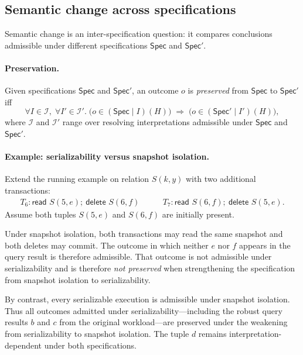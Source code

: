 \documentclass[acmsmall,nonacm]{acmart}
\theoremstyle{remark}
\numberwithin{definition}{section}
\numberwithin{theorem}{section}
\numberwithin{lemma}{section}
\numberwithin{corollary}{section}
\numberwithin{remark}{section}
\numberwithin{example}{section}
\numberwithin{observation}{section}
\numberwithin{assumption}{section}
\newcommand{\Spec}{\mathsf{Spec}}
\begin{document}
\subsection{Semantic change across specifications}
\label{sec:semantic-change}

Semantic change is an inter-specification question: it compares conclusions
admissible under different specifications $\Spec$ and $\Spec'$.

\paragraph{Preservation.}
Given specifications $\Spec$ and $\Spec'$, an outcome $o$ is \emph{preserved}
from $\Spec$ to $\Spec'$ iff
\[
  \forall I \in \mathcal{I},\; \forall I' \in \mathcal{I}'.\;
  \bigl(o \in (\Spec \mid I)(H)\bigr)
  \;\Rightarrow\;
  \bigl(o \in (\Spec' \mid I')(H)\bigr),
\]
where $\mathcal{I}$ and $\mathcal{I}'$ range over resolving interpretations
admissible under $\Spec$ and $\Spec'$.

\paragraph{Example: serializability versus snapshot isolation.}
Extend the running example on relation $S(k,y)$ with two additional transactions:
\[
\begin{array}{ll}
T_6: \textsf{read } S(5,e);\ \textsf{delete } S(6,f) \qquad &
T_7: \textsf{read } S(6,f);\ \textsf{delete } S(5,e).
\end{array}
\]
Assume both tuples $S(5,e)$ and $S(6,f)$ are initially present.

Under snapshot isolation, both transactions may read the same snapshot and both
deletes may commit.
The outcome in which neither $e$ nor $f$ appears in the query result is therefore
admissible.
That outcome is not admissible under serializability and is therefore
\emph{not preserved} when strengthening the specification from snapshot isolation
to serializability.

By contrast, every serializable execution is admissible under snapshot isolation.
Thus all outcomes admitted under serializability—including the robust query
results $b$ and $c$ from the original workload—are preserved under the weakening
from serializability to snapshot isolation.
The tuple $d$ remains interpretation-dependent under both specifications.
\end{document}
